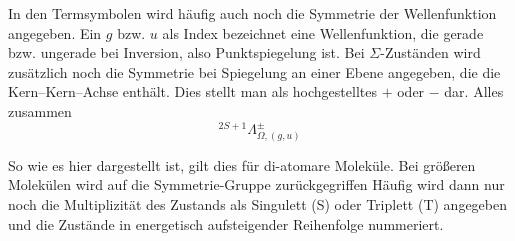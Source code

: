 

In den Termsymbolen wird häufig auch noch die Symmetrie der Wellenfunktion angegeben. Ein $g$ bzw. $u$ als Index bezeichnet eine Wellenfunktion, die gerade bzw. ungerade bei Inversion, also Punktspiegelung ist. Bei $\Sigma$-Zuständen wird zusätzlich noch die Symmetrie bei Spiegelung an einer Ebene angegeben, die die Kern--Kern--Achse enthält. Dies stellt man als hochgestelltes $+$ oder $-$ dar.
Alles zusammen
\begin{equation}
 ^{2 S + 1}\Lambda_{\Omega, (g,u)}^\pm
\end{equation}

So wie es hier dargestellt ist, gilt dies für di-atomare Moleküle. Bei größeren Molekülen wird auf die Symmetrie-Gruppe zurückgegriffen Häufig wird dann nur noch die Multiplizität des Zustands als Singulett (S) oder Triplett (T) angegeben und die Zustände in energetisch aufsteigender Reihenfolge nummeriert.





